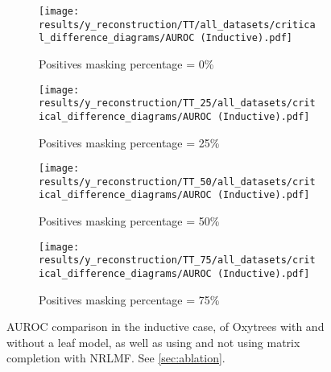 \documentclass[sn-mathphys-num]{sn-jnl}%
\theoremstyle{thmstyleone}%
\theoremstyle{thmstyletwo}%
\theoremstyle{thmstylethree}%
\begin{document}
\begin{appendices}
\begin{figure}
    \begin{subfigure}{.49\textwidth}
        \centering
        \texttt{[image: results/y\_reconstruction/TT/all\_datasets/critical\_difference\_diagrams/AUROC (Inductive).pdf]}
        \caption{Positives masking percentage = 0\%}
    \end{subfigure}
    \begin{subfigure}{.49\textwidth}
        \centering
        \texttt{[image: results/y\_reconstruction/TT\_25/all\_datasets/critical\_difference\_diagrams/AUROC (Inductive).pdf]}
        \caption{Positives masking percentage = 25\%}
    \end{subfigure}
    
    \begin{subfigure}{.49\textwidth}
        \centering
        \texttt{[image: results/y\_reconstruction/TT\_50/all\_datasets/critical\_difference\_diagrams/AUROC (Inductive).pdf]}
        \caption{Positives masking percentage = 50\%}
    \end{subfigure}
    \begin{subfigure}{.49\textwidth}
        \centering
        \texttt{[image: results/y\_reconstruction/TT\_75/all\_datasets/critical\_difference\_diagrams/AUROC (Inductive).pdf]}
        \caption{Positives masking percentage = 75\%}
    \end{subfigure}   

    \caption{AUROC comparison in the inductive case, of Oxytrees with and without a leaf model, as well as using and not using matrix completion with NRLMF. See \autoref{sec:ablation}.}
    \label{fig:ablation inductive auroc}
\end{figure}



\end{appendices}
\end{document}
